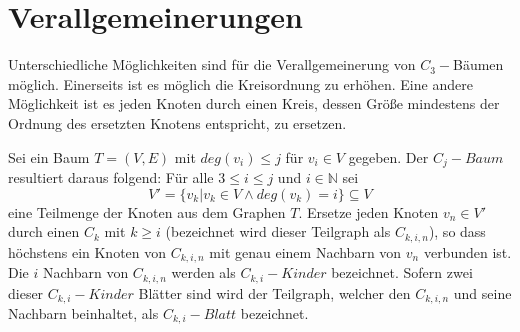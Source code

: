 \section{Verallgemeinerungen}
Unterschiedliche Möglichkeiten sind für die Verallgemeinerung von $C_3-$Bäumen möglich. Einerseits ist es möglich die Kreisordnung zu erhöhen. Eine andere Möglichkeit ist es jeden Knoten durch einen Kreis, dessen Größe mindestens der Ordnung des ersetzten Knotens entspricht, zu ersetzen.

\begin{defi}
Sei ein Baum $T=(V,E)$ mit $deg(v_i)\leq j$ für $v_i \in V$ gegeben. Der $C_j-Baum$ resultiert daraus folgend: 
Für alle $3 \leq i \leq j$ und $i \in \mathbb{N}$ sei $$V'=\{v_k|v_k \in V \wedge deg(v_k)=i\}\subseteq V$$ eine Teilmenge der Knoten aus dem Graphen $T$. Ersetze jeden Knoten $v_n \in V'$ durch einen $C_k$ mit $k \geq i$ (bezeichnet wird dieser Teilgraph als \emph{$C_{k,i,n}$}), so dass höchstens ein Knoten von $C_{k,i,n}$ mit genau einem Nachbarn von $v_n$ verbunden ist. Die $i$ Nachbarn von $C_{k,i,n}$ werden als \emph{$C_{k,i}-Kinder$} bezeichnet. Sofern zwei dieser $C_{k,i}-Kinder$ Blätter sind wird der Teilgraph, welcher den $C_{k,i,n}$ und seine Nachbarn beinhaltet, als \emph{$C_{k,i}-Blatt$} bezeichnet.
\end{defi}

